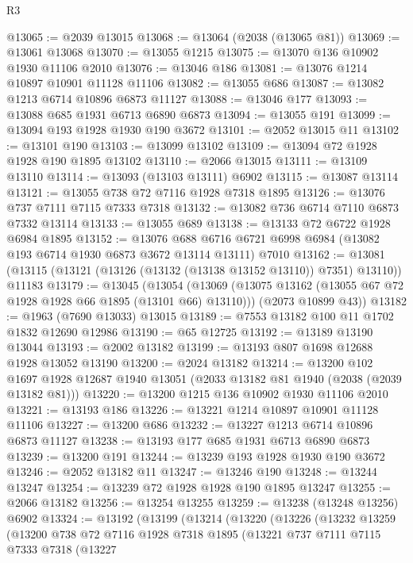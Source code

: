 \begin{lexlean}{R3}
\begin{coremodule}
@13065 := @2039 @13015
@13068 := @13064 (@2038 (@13065 @81))
@13069 := @13061 @13068
@13070 := @13055 @1215
@13075 := @13070 @136 @10902 @1930 @11106 @2010
@13076 := @13046 @186
@13081 := @13076 @1214 @10897 @10901 @11128 @11106
@13082 := @13055 @686
@13087 := @13082 @1213 @6714 @10896 @6873 @11127
@13088 := @13046 @177
@13093 := @13088 @685 @1931 @6713 @6890 @6873
@13094 := @13055 @191
@13099 := @13094 @193 @1928 @1930 @190 @3672
@13101 := @2052 @13015 @11
@13102 := @13101 @190
@13103 := @13099 @13102
@13109 := @13094 @72 @1928 @1928 @190 @1895 @13102
@13110 := @2066 @13015
@13111 := @13109 @13110
@13114 := @13093 (@13103 @13111) @6902
@13115 := @13087 @13114
@13121 := @13055 @738 @72 @7116 @1928 @7318 @1895
@13126 := @13076 @737 @7111 @7115 @7333 @7318
@13132 := @13082 @736 @6714 @7110 @6873 @7332 @13114
@13133 := @13055 @689
@13138 := @13133 @72 @6722 @1928 @6984 @1895
@13152 := @13076
    @688
    @6716
    @6721
    @6998
    @6984
    (@13082 @193 @6714 @1930 @6873 @3672 @13114 @13111)
    @7010
@13162 := @13081 (@13115 (@13121 (@13126 (@13132 (@13138 @13152 @13110)) @7351) @13110)) @11183
@13179 := @13045
    (@13054
      (@13069 (@13075 @13162 (@13055 @67 @72 @1928 @1928 @66 @1895 (@13101 @66) @13110)))
      (@2073 @10899 @43))
@13182 := @1963 (@7690 @13033) @13015
@13189 := @7553 @13182 @100 @11 @1702 @1832 @12690 @12986
@13190 := @65 @12725
@13192 := @13189 @13190 @13044
@13193 := @2002 @13182
@13199 := @13193 @807 @1698 @12688 @1928 @13052 @13190
@13200 := @2024 @13182
@13214 := @13200
    @102
    @1697
    @1928
    @12687
    @1940
    @13051
    (@2033 @13182 @81 @1940 (@2038 (@2039 @13182 @81)))
@13220 := @13200 @1215 @136 @10902 @1930 @11106 @2010
@13221 := @13193 @186
@13226 := @13221 @1214 @10897 @10901 @11128 @11106
@13227 := @13200 @686
@13232 := @13227 @1213 @6714 @10896 @6873 @11127
@13238 := @13193 @177 @685 @1931 @6713 @6890 @6873
@13239 := @13200 @191
@13244 := @13239 @193 @1928 @1930 @190 @3672
@13246 := @2052 @13182 @11
@13247 := @13246 @190
@13248 := @13244 @13247
@13254 := @13239 @72 @1928 @1928 @190 @1895 @13247
@13255 := @2066 @13182
@13256 := @13254 @13255
@13259 := @13238 (@13248 @13256) @6902
@13324 := @13192
    (@13199
      (@13214
        (@13220
          (@13226
            (@13232
              @13259
              (@13200
                @738
                @72
                @7116
                @1928
                @7318
                @1895
                (@13221
                  @737
                  @7111
                  @7115
                  @7333
                  @7318
                  (@13227

\end{coremodule}
\end{lexlean}
